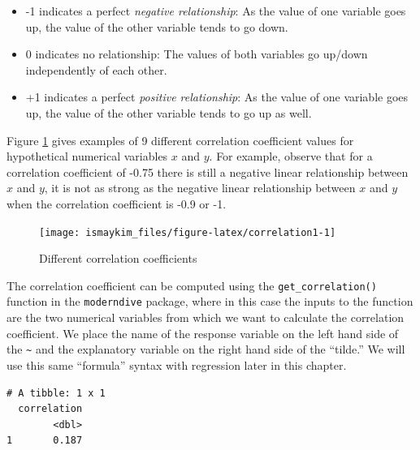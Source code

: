 \documentclass[12pt, krantz2,]{krantz}
\makeatletter
\newenvironment{Shaded}{\begin{snugshade}}{\end{snugshade}}
\newcommand{\DataTypeTok}[1]{\textcolor[rgb]{0.27,0.27,0.27}{#1}}
\newcommand{\KeywordTok}[1]{\textcolor[rgb]{0.27,0.27,0.27}{\textbf{#1}}}
\newcommand{\NormalTok}[1]{#1}
\newcommand{\OperatorTok}[1]{\textcolor[rgb]{0.43,0.43,0.43}{\textbf{#1}}}
\newcommand{\StringTok}[1]{\textcolor[rgb]{0.5,0.5,0.5}{#1}}
\providecommand{\tightlist}{%
  \setlength{\itemsep}{0pt}\setlength{\parskip}{0pt}}
\newenvironment{kframe}{%
\medskip{}
\setlength{\fboxsep}{.8em}
 \def\at@end@of@kframe{}%
 \ifinner\ifhmode%
  \def\at@end@of@kframe{\end{minipage}}%
  \begin{minipage}{\columnwidth}%
 \fi\fi%
 \def\FrameCommand##1{\hskip\@totalleftmargin \hskip-\fboxsep
 \colorbox{shadecolor}{##1}\hskip-\fboxsep
     \hskip-\linewidth \hskip-\@totalleftmargin \hskip\columnwidth}%
 \MakeFramed {\advance\hsize-\width
   \@totalleftmargin\z@ \linewidth\hsize
   \@setminipage}}%
 {\par\unskip\endMakeFramed%
 \at@end@of@kframe}
\renewenvironment{Shaded}{\begin{kframe}}{\end{kframe}}
\makeatother
\begin{document}
\begin{itemize}
\tightlist
\item
  -1 indicates a perfect \emph{negative relationship}: As the value of one variable goes up, the value of the other variable tends to go down.
\item
  0 indicates no relationship: The values of both variables go up/down independently of each other.
\item
  +1 indicates a perfect \emph{positive relationship}: As the value of one variable goes up, the value of the other variable tends to go up as well.
\end{itemize}

Figure \ref{fig:correlation1} gives examples of 9 different correlation coefficient values for hypothetical numerical variables \(x\) and \(y\). For example, observe that for a correlation coefficient of -0.75 there is still a negative linear relationship between \(x\) and \(y\), it is not as strong as the negative linear relationship between \(x\) and \(y\) when the correlation coefficient is -0.9 or -1.

\begin{figure}

{\centering \texttt{[image: ismaykim\_files/figure-latex/correlation1-1]} 

}

\caption{Different correlation coefficients}\label{fig:correlation1}
\end{figure}

The correlation coefficient can be computed using the \texttt{get\_correlation()} function in the \texttt{moderndive} package, where in this case the inputs to the function are the two numerical variables from which we want to calculate the correlation coefficient. We place the name of the response variable on the left hand side of the \texttt{\textasciitilde{}} and the explanatory variable on the right hand side of the ``tilde.'' We will use this same ``formula'' syntax with regression later in this chapter.

\begin{Shaded}
\end{Shaded}

\begin{verbatim}
# A tibble: 1 x 1
  correlation
        <dbl>
1       0.187
\end{verbatim}
\end{document}
